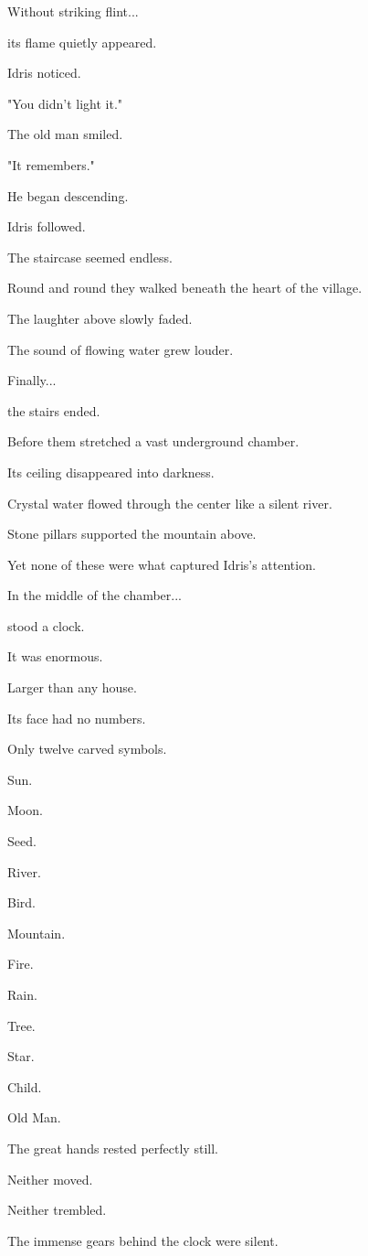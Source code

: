 \documentclass[12pt,openany]{book}
\begin{document}
Without striking flint...

its flame quietly appeared.

Idris noticed.

"You didn't light it."

The old man smiled.

"It remembers."

He began descending.

Idris followed.

The staircase seemed endless.

Round and round they walked beneath the heart of the village.

The laughter above slowly faded.

The sound of flowing water grew louder.

Finally...

the stairs ended.

Before them stretched a vast underground chamber.

Its ceiling disappeared into darkness.

Crystal water flowed through the center like a silent river.

Stone pillars supported the mountain above.

Yet none of these were what captured Idris's attention.

In the middle of the chamber...

stood a clock.

It was enormous.

Larger than any house.

Its face had no numbers.

Only twelve carved symbols.

Sun.

Moon.

Seed.

River.

Bird.

Mountain.

Fire.

Rain.

Tree.

Star.

Child.

Old Man.

The great hands rested perfectly still.

Neither moved.

Neither trembled.

The immense gears behind the clock were silent.
\end{document}
